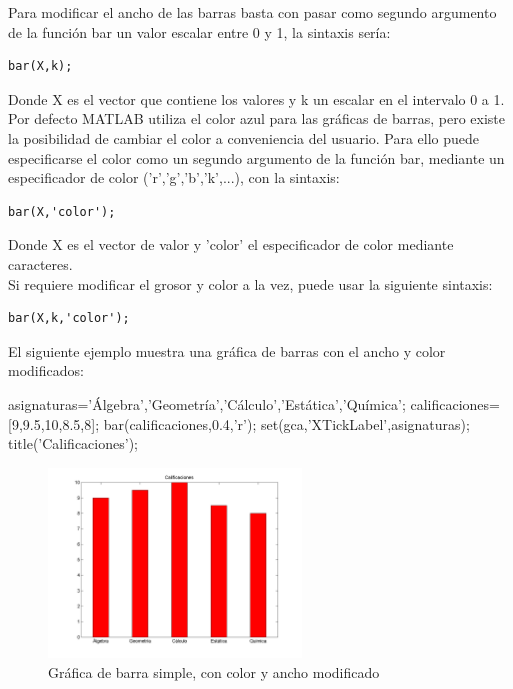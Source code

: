Para modificar el ancho de las barras basta con pasar como segundo argumento de la función bar un 
valor escalar entre 0 y 1, la sintaxis sería:

\begin{verbatim}
bar(X,k);
\end{verbatim}

Donde X es el vector que contiene los valores y k un escalar en el intervalo 0 a 1. \\

Por defecto MATLAB utiliza el color azul para las gráficas de barras, pero existe la posibilidad 
de cambiar el color a conveniencia del usuario. Para ello puede especificarse el color como un 
segundo argumento de la función bar, mediante un especificador de color ('r','g','b','k',...), 
con la sintaxis:

\begin{verbatim}
bar(X,'color');
\end{verbatim}

Donde X es el vector de valor y 'color' el especificador de color mediante caracteres.\\

Si requiere modificar el grosor y color a la vez, puede usar la siguiente sintaxis:

\begin{verbatim}
bar(X,k,'color');
\end{verbatim}

El siguiente ejemplo muestra una gráfica de barras con el ancho y color modificados:

\begin{matlab}
asignaturas={'Álgebra','Geometría','Cálculo','Estática','Química'};
calificaciones=[9,9.5,10,8.5,8];
bar(calificaciones,0.4,'r');
set(gca,'XTickLabel',asignaturas);
title('Calificaciones');
\end{matlab}

\begin{figure}[!h]
\centering
\includegraphics[width=0.6\textwidth]{src/img/ch4/barra_simple_color.png}
\caption{Gráfica de barra simple, con color y ancho modificado}
\label{fig:barra_simple_color}
\end{figure}

